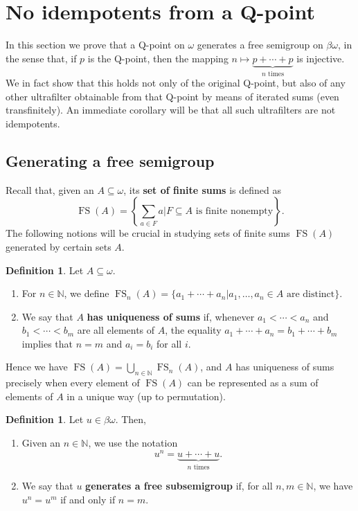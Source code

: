 \documentclass[10pt]{amsart}
\DeclareMathOperator{\fs}{FS}
\theoremstyle{definition}
\newtheorem{definition}[theorem]{Definition}
\theoremstyle{remark}
\begin{document}
\section{No idempotents from a Q-point}

In this section we prove that a Q-point on $\omega$ generates a free semigroup on $\beta\omega$, in the sense that, if $p$ is the Q-point, then the mapping $n\longmapsto\underbrace{p+\cdots+p}_{n\text{ times}}$ is injective. We in fact show that this holds not only of the original Q-point, but also of any other ultrafilter obtainable from that Q-point by means of iterated sums (even transfinitely). An immediate corollary will be that all such ultrafilters are not idempotents.

\subsection{Generating a free semigroup}

Recall that, given an $A\subseteq\omega$, its {\bf set of finite sums} is defined as
\begin{equation*}
    \fs(A)=\left\{\sum_{a\in F}a\bigg|F\subseteq A\text{ is finite nonempty}\right\}.
\end{equation*}
The following notions will be crucial in studying sets of finite sums $\fs(A)$ generated by certain sets $A$.

\begin{definition}
Let $A\subseteq\omega$.
\begin{enumerate}
    \item For $n\in\mathbb N$, we define $\fs_n(A)=\{a_1+\cdots+a_n\big|a_1,\ldots,a_n\in A\text{ are distinct}\}$.
    \item We say that $A$ {\bf has uniqueness of sums} if, whenever $a_1<\cdots<a_n$ and $b_1<\cdots<b_m$ are all elements of $A$, the equality $a_1+\cdots+a_n=b_1+\cdots+b_m$ implies that $n=m$ and $a_i=b_i$ for all $i$.
\end{enumerate}
\end{definition}

Hence we have $\fs(A)=\bigcup_{n\in\mathbb N}\fs_n(A)$, and $A$ has uniqueness of sums precisely when every element of $\fs(A)$ can be represented as a sum of elements of $A$ in a unique way (up to permutation).

\begin{definition}
Let $u\in\beta\omega$. Then,
\begin{enumerate}
    \item Given an $n\in\mathbb N$, we use the notation
\begin{equation*}
    u^n=\underbrace{u+\cdots+u}_{n\text{ times}}.
\end{equation*}
    \item We say that $u$ {\bf generates a free subsemigroup} if, for all $n,m\in\mathbb N$, we have $u^n=u^m$ if and only if $n=m$.
\end{enumerate}
\end{definition}
\end{document}
